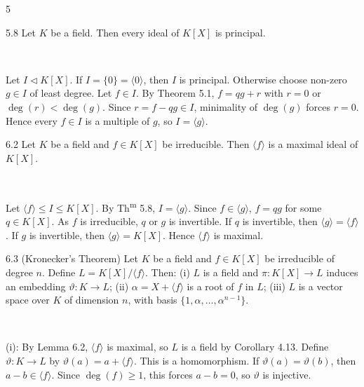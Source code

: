 \documentclass[8pt]{extarticle}
\makeatletter
\renewenvironment{proof}[1][\proofname]{%
  \pushQED{\qed}%
  \par\noindent\normalfont\itshape #1\@addpunct{.}\ \normalfont\ignorespaces
}{%
  \popQED%
  \par
}
\makeatother
\begin{document}
\begin{multicols*}{5}
        \begin{theorem}{5.8}
            Let \(K\) be a field. Then every ideal of \(K[X]\) is principal.
        \end{theorem}

        \begin{proof}
            Let \(I\lhd K[X]\). If \(I=\{0\}=\langle0\rangle\), then \(I\) is principal. Otherwise choose non-zero \(g\in I\) of least degree. Let \(f\in I\). By Theorem 5.1, \(f=qg+r\) with \(r=0\) or \(\deg(r)<\deg(g)\). Since \(r=f-qg\in I\), minimality of \(\deg(g)\) forces \(r=0\). Hence every \(f\in I\) is a multiple of \(g\), so \(I=\langle g\rangle\).
        \end{proof}

        \begin{lemma}{6.2}
            Let \(K\) be a field and \(f\in K[X]\) be irreducible. Then \(\langle f\rangle\) is a maximal ideal of \(K[X]\).
        \end{lemma}

        \begin{proof}
            Let \(\langle f\rangle\le I\le K[X]\). By Th\textsuperscript{m} 5.8, \(I=\langle g\rangle\). Since \(f\in\langle g\rangle\), \(f=qg\) for some \(q\in K[X]\). As \(f\) is irreducible, \(q\) or \(g\) is invertible. If \(q\) is invertible, then \(\langle g\rangle=\langle f\rangle\). If \(g\) is invertible, then \(\langle g\rangle=K[X]\). Hence \(\langle f\rangle\) is maximal.
        \end{proof}

        \begin{theorem}{6.3}
            (Kronecker's Theorem) Let \(K\) be a field and \(f\in K[X]\) be irreducible of degree \(n\). Define \(L=K[X]/\langle f\rangle\). Then: (i) \(L\) is a field and \(\pi:K[X]\to L\) induces an embedding \(\vartheta:K\to L\); (ii) \(\alpha=X+\langle f\rangle\) is a root of \(f\) in \(L\); (iii) \(L\) is a vector space over \(K\) of dimension \(n\), with basis \(\{1,\alpha,\ldots,\alpha^{n-1}\}\).
        \end{theorem}

        \begin{proof}
            (i): By Lemma 6.2, \(\langle f\rangle\) is maximal, so \(L\) is a field by Corollary 4.13. Define \(\vartheta:K\to L\) by \(\vartheta(a)=a+\langle f\rangle\). This is a homomorphism. If \(\vartheta(a)=\vartheta(b)\), then \(a-b\in\langle f\rangle\). Since \(\deg(f)\ge1\), this forces \(a-b=0\), so \(\vartheta\) is injective.


\end{proof}
\end{multicols*}
\end{document}
